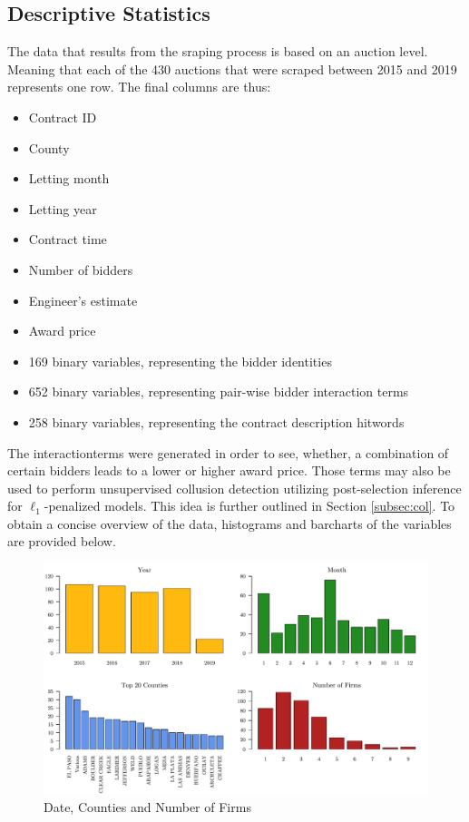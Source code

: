 \documentclass[a4paper,12pt, headsepline]{scrartcl}
\numberwithin{equation}{section}
\begin{document}
\subsection{Descriptive Statistics}\label{subsec:desc}
The data that results from the sraping process is based on an auction level. Meaning that each of the 430 auctions that were scraped between 2015 and 2019 represents one row. The final columns are thus:

\begin{itemize}
	\item Contract ID
	\item County
	\item Letting month
	\item Letting year
	\item Contract time
	\item Number of bidders
	\item Engineer's estimate
	\item Award price
	\item 169 binary variables, representing the bidder identities
	\item 652 binary variables, representing pair-wise bidder interaction terms 
	\item 258 binary variables, representing the contract description hitwords
\end{itemize}

The interactionterms were generated in order to see, whether, a combination of certain bidders leads to a lower or higher award price. Those terms may also be used to perform unsupervised collusion detection utilizing post-selection inference for $\ell_1$-penalized models. This idea is further outlined in Section \ref{subsec:col}. To obtain a concise overview of the data,  histograms and barcharts of the variables are provided below.

\begin{figure}[H]
	\includegraphics[width = 14	cm]{figures/barplots.pdf}
	\caption{Date, Counties and Number of Firms}\label{fig:barplots}
\end{figure}
\end{document}
